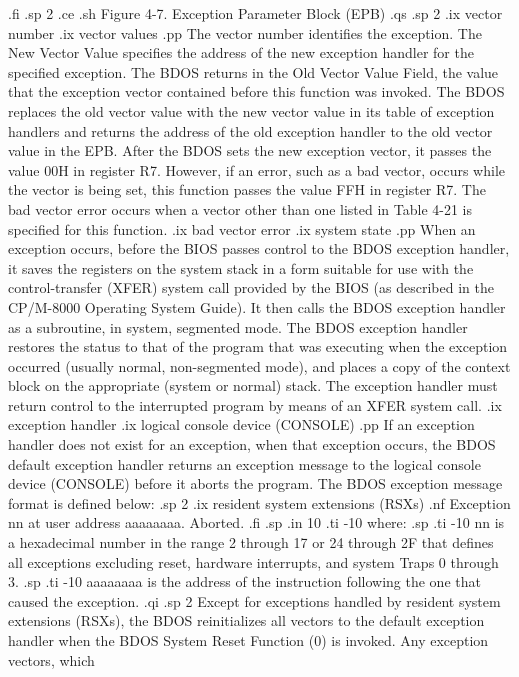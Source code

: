 .fi
.sp 2
.ce
.sh
Figure 4-7. Exception Parameter Block (EPB)
.qs
.sp 2 
.ix vector number
.ix vector values
.pp
The vector number identifies the exception. The New Vector Value specifies
the address of the new exception handler for the specified exception. The
BDOS returns in the Old Vector Value Field, the value that the exception
vector contained before this function was invoked.  The BDOS replaces the
old vector value with the new vector value in its table of exception
handlers and returns the address of the old exception handler to the old
vector value in the EPB.  After the BDOS sets the new exception vector, it
passes the value 00H in register   R7. However, if an error, such as a bad
vector, occurs while the vector is being set, this function passes the
value FFH in register   R7.  The bad vector error occurs when a vector
other than one listed in Table 4-21 is specified for this function. 
.ix bad vector error
.ix system state
.pp
When an exception occurs, before the BIOS passes control to the BDOS
exception handler, it saves the registers on the system stack
in a form suitable for use with the control-transfer (XFER) system
call provided by the BIOS (as described in the CP/M-8000 Operating
System Guide).  It then calls the BDOS exception handler as a subroutine,
in system, segmented mode.  The BDOS exception handler restores the
status to that of the program that was executing when the exception
occurred (usually normal, non-segmented mode), and places a copy
of the context block on the appropriate (system or normal) stack.
The exception handler must return control to the interrupted program
by means of an XFER system call.
.ix exception handler
.ix logical console device (CONSOLE)
.pp
If an exception handler does not exist for an exception, when
that exception occurs, the BDOS default exception handler returns
an exception message to the logical console device (CONSOLE)
before it aborts the program. The BDOS exception message format is
defined below: 
.sp 2
.ix resident system extensions (RSXs) 
.nf
           Exception nn at user address aaaaaaaa. Aborted.
.fi
.sp 
.in 10
.ti -10
where:
.sp 
.ti -10
nn        is a hexadecimal number in the range 2 through 17 or 24
through 2F that defines all exceptions excluding reset,
hardware interrupts, and system Traps 0 through 3.
.sp 
.ti -10
aaaaaaaa  is the address of the instruction following the one 
that caused the exception.
.qi
.sp 2
Except for exceptions handled by resident system extensions (RSXs), the
BDOS reinitializes all vectors to the default exception handler when the
BDOS System Reset Function (0) is invoked. Any exception vectors, which
